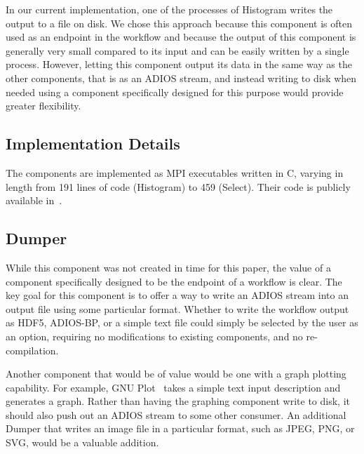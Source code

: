 In our current implementation, one of the processes
of Histogram writes the
output to a file on disk. We chose this approach
because this component is often used as an
endpoint in the workflow and because the output of this
component is generally very small compared to its input
and can be easily written by a single process.
However, letting this component output
its data in the same way as the other components,
that is as an ADIOS stream, and instead writing to
disk when needed using a component specifically
designed for this purpose would
provide greater flexibility.

\subsection{Implementation Details}
The components are implemented as MPI executables
written in C, varying in length from
191 lines of code (Histogram) to
459 (Select).
Their code is publicly available
in~\cite{champsaur:superglue-repo}.


\subsection{Dumper}

While this component was not created in time for this paper, the value of
a component specifically designed to be the endpoint of a workflow
is clear. The key goal for this component is to offer a way to write an ADIOS stream into an
output file using some particular format. Whether to write the workflow output as
HDF5, ADIOS-BP, or a simple text file could simply be selected by the user as an option,
requiring no modifications to existing components, and no re-compilation.

Another component that would be of value would be one with a graph plotting capability.
For example, GNU
Plot~\cite{racine:2006:gnuplot} takes a simple text input description and
generates a graph.  Rather than having the graphing component write to
disk, it should also push out an ADIOS stream to some other consumer. An
additional Dumper that writes an image file in a particular format, such as
JPEG, PNG, or SVG, would be a valuable addition.
\fi
